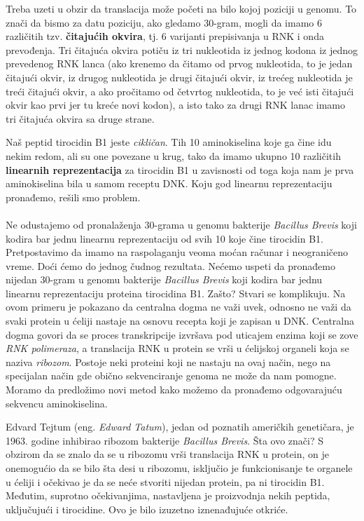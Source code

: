  Treba uzeti u obzir da translacija može početi na bilo kojoj poziciji u genomu. To znači da bismo za datu poziciju, ako gledamo $30$-gram, mogli da imamo 6 različitih tzv. \textbf{čitajućih okvira}, tj. 6 varijanti prepisivanja u RNK i onda prevođenja. Tri čitajuća okvira potiču iz tri nukleotida iz jednog kodona iz jednog prevedenog RNK lanca (ako krenemo da čitamo od prvog nukleotida, to je jedan čitajući okvir, iz drugog nukleotida je drugi čitajući okvir, iz trećeg nukleotida je treći čitajući okvir, a ako pročitamo od četvrtog nukleotida, to je već isti čitajući okvir kao prvi jer tu kreće novi kodon), a isto tako za drugi RNK lanac imamo tri čitajuća okvira sa druge strane. 

Naš peptid tirocidin B1 jeste \textit{cikličan}. Tih 10 aminokiselina koje ga čine idu nekim redom, ali su one povezane u krug, tako da imamo ukupno 10 različitih \textbf{linearnih reprezentacija} za tirocidin B1 u zavisnosti od toga koja nam je prva aminokiselina bila u samom receptu DNK. Koju god linearnu reprezentaciju pronađemo, rešili smo problem. 
\\\\
\indent Ne odustajemo od pronalaženja $30$-grama u genomu bakterije \textit{Bacillus Brevis} koji kodira bar jednu linearnu reprezentaciju od svih 10 koje čine tirocidin B1. Pretpostavimo da imamo na raspolaganju veoma moćan računar i neograničeno vreme. Doći ćemo do jednog čudnog rezultata. Nećemo uspeti da pronađemo nijedan $30$-gram u genomu bakterije \textit{Bacillus Brevis} koji kodira bar jednu linearnu reprezentaciju proteina tirocidina B1. Zašto? Stvari se komplikuju. Na ovom primeru je pokazano da centralna dogma ne važi uvek, odnosno ne važi da svaki protein u ćeliji nastaje na osnovu recepta koji je zapisan u DNK. Centralna dogma govori da se proces transkripcije izvršava pod uticajem enzima koji se zove \textit{RNK polimeraza}, a translacija RNK u protein se vrši u ćelijskoj organeli koja se naziva \textit{ribozom}. Postoje neki proteini koji ne nastaju na ovaj način, nego na specijalan način gde obično sekvenciranje genoma ne može da nam pomogne. Moramo da predložimo novi metod kako možemo da pronađemo odgovarajuću sekvencu aminokiselina. 

Edvard Tejtum (eng. \textit{Edward Tatum}), jedan od poznatih američkih genetičara, je 1963. godine inhibirao ribozom bakterije \textit{Bacillus Brevis}. Šta ovo znači? S obzirom da se znalo da se u ribozomu vrši translacija RNK u protein, on je onemogućio da se bilo šta desi u ribozomu, isključio je funkcionisanje te organele u ćeliji i očekivao je da se neće stvoriti nijedan protein, pa ni tirocidin B1. Međutim, suprotno očekivanjima, nastavljena je proizvodnja nekih peptida, uključujući i tirocidine. Ovo je bilo izuzetno iznenađujuće otkriće.

